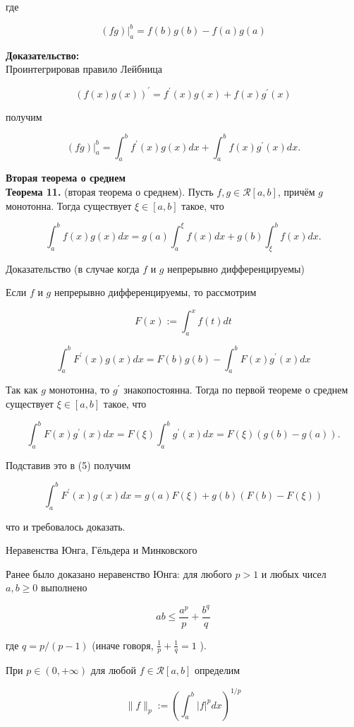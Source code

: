 \documentclass[a4paper,12pt]{article} %
\begin{document}
	где
	
	$$
	\left.(f g)\right|_{a} ^{b}=f(b) g(b)-f(a) g(a)
	$$
	
	\textbf{Доказательство:\\}
	Проинтегрировав правило Лейбница
	
	$$
	(f(x) g(x))^{\prime}=f^{\prime}(x) g(x)+f(x) g^{\prime}(x)
	$$
	
	получим
	
	$$
	\left.(f g)\right|_{a} ^{b}=\int_{a}^{b} f^{\prime}(x) g(x) d x+\int_{a}^{b} f(x) g^{\prime}(x) d x .
	$$
	
	\textbf{Вторая теорема о среднем}\\
	\textbf{Теорема 11.} (вторая теорема о среднем). Пусть $f, g \in \mathcal{R}[a, b]$, причём $g$ монотонна. Тогда существует $\xi \in[a, b]$ такое, что
	
	$$
	\int_{a}^{b} f(x) g(x) d x=g(a) \int_{a}^{\xi} f(x) d x+g(b) \int_{\xi}^{b} f(x) d x .
	$$
	
	Доказательство (в случае когда $f$ и $g$ непрерывно дифференцируемы)
	
	Если $f$ и $g$ непрерывно дифференцируемы, то рассмотрим
	
	$$
	F(x):=\int_{a}^{x} f(t) d t
	$$
	
	$$
	\int_{a}^{b} F^{\prime}(x) g(x) d x=F(b) g(b)-\int_{a}^{b} F(x) g^{\prime}(x) d x
	$$
	
	Так как $g$ монотонна, то $g^{\prime}$ знакопостоянна. Тогда по первой теореме о среднем существует $\xi \in[a, b]$ такое, что
	
	$$
	\int_{a}^{b} F(x) g^{\prime}(x) d x=F(\xi) \int_{a}^{b} g^{\prime}(x) d x=F(\xi)(g(b)-g(a)) .
	$$
	
	Подставив это в (5) получим
	
	$$
	\int_{a}^{b} F^{\prime}(x) g(x) d x=g(a) F(\xi)+g(b)(F(b)-F(\xi))
	$$
	
	что и требовалось доказать.
	
	Неравенства Юнга, Гёльдера и Минковского
	
	Ранее было доказано неравенство Юнга: для любого $p>1$ и любых чисел $a, b \geq 0$ выполнено
	
	$$
	a b \leq \frac{a^{p}}{p}+\frac{b^{q}}{q}
	$$
	
	где $q=p /(p-1)$ (иначе говоря, $\frac{1}{p}+\frac{1}{q}=1$ ).
	
	При $p \in(0,+\infty)$ для любой $f \in \mathcal{R}[a, b]$ определим
	
	$$
	\|f\|_{p}:=\left(\int_{a}^{b}|f|^{p} d x\right)^{1 / p}
	$$
	
\end{document}
